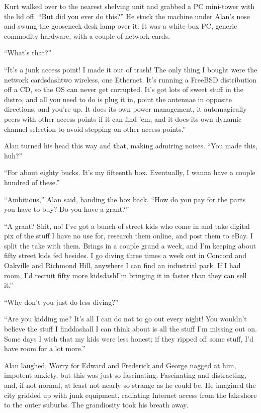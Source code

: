 Kurt walked over to the nearest shelving unit and grabbed a PC
mini-tower with the lid off.  ``But did you ever do this?'' He stuck
the machine under Alan's nose and swung the gooseneck desk lamp over
it.  It was a white-box PC, generic commodity hardware, with a couple
of network cards.

``What's that?''

``It's a junk access point!  I made it out of trash!  The only thing I
bought were the network cardsdash{}two wireless, one Ethernet.  It's
running a FreeBSD distribution off a CD, so the OS can never get
corrupted.  It's got lots of sweet stuff in the distro, and all you
need to do is plug it in, point the antennae in opposite directions,
and you're up.  It does its own power management, it automagically
peers with other access points if it can find 'em, and it does its own
dynamic channel selection to avoid stepping on other access points.''

Alan turned his head this way and that, making admiring noises.  ``You
made this, huh?''

``For about eighty bucks.  It's my fifteenth box.  Eventually, I wanna
have a couple hundred of these.''

``Ambitious,'' Alan said, handing the box back.  ``How do you pay for
the parts you have to buy?  Do you have a grant?''

``A grant?  Shit, no!  I've got a bunch of street kids who come in and
take digital pix of the stuff I have no use for, research them online,
and post them to eBay.  I split the take with them.  Brings in a
couple grand a week, and I'm keeping about fifty street kids fed
besides.  I go diving three times a week out in Concord and Oakville
and Richmond Hill, anywhere I can find an industrial park.  If I had
room, I'd recruit fifty more kidsdash{}I'm bringing it in faster than
they can sell it.''

``Why don't you just do less diving?''

``Are you kidding me?  It's all I can do not to go out every night! 
You wouldn't believe the stuff I finddash{}all I can think about is all
the stuff I'm missing out on.  Some days I wish that my kids were less
honest; if they ripped off some stuff, I'd have room for a lot more.''

Alan laughed.  Worry for Edward and Frederick and George nagged at
him, impotent anxiety, but this was just so fascinating.  Fascinating
and distracting, and, if not normal, at least not nearly so strange as
he could be.  He imagined the city gridded up with junk equipment,
radiating Internet access from the lakeshore to the outer suburbs. 
The grandiosity took his breath away.

